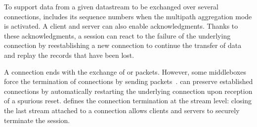 To support data from a given datastream to be exchanged over several \tcp
connections, \tcpls includes its sequence numbers when the multipath aggregation
mode is activated. A client and server can also
enable acknowledgments. Thanks to these \tcpls
acknowledgments, a \tcpls session can react to the failure of the underlying
\tcp connection by reestablishing a new \tcp connection to continue the transfer
of data and replay the records that have been lost.

A \tcp connection ends with the exchange of \fin or \rst packets. However,
some middleboxes force the termination of \tcp connections
by sending \rst packets~\cite{rfc3360,weaver2009detecting}. \tcpls
can preserve established connections by automatically restarting
the underlying \tcp connection upon reception of a spurious reset. \tcpls
defines the connection termination at the stream level: closing the last stream
attached to a \tcp connection allows clients and servers to securely
terminate the \tcpls session.



